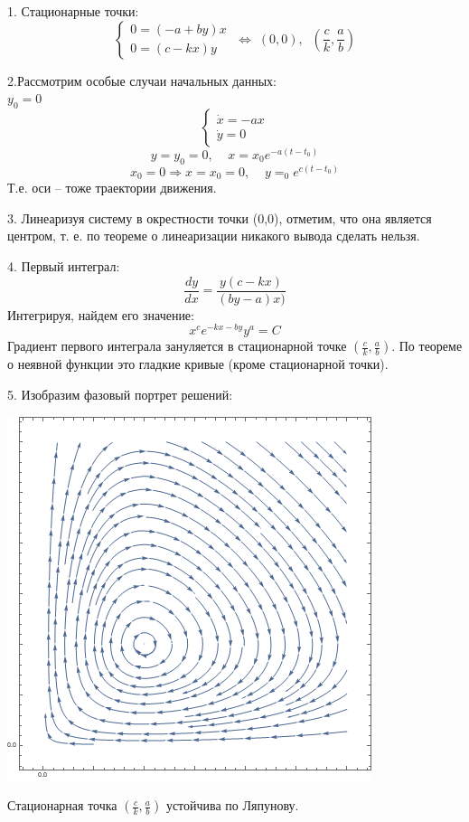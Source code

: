 \documentclass[10pt]{report}
\begin{document}
1. Стационарные точки:\\
\[\left\{
\begin{array}{lr}
0=(-a+by)x\\
0=(c-kx)y
\end{array}
\right.\; \Leftrightarrow \; (0, 0), \;\; \left(\frac c k, \frac a b\right)\]

2.Рассмотрим особые случаи начальных данных:\\
 $y_0=0$
\[\left\{
\begin{array}{lr}
\dot{x}=-ax\\
\dot{y}=0
\end{array}
\right.\]
\[y=y_0=0, \;\;\;\; x=x_0e^{-a(t-t_0)}\]
\[x_0=0 \Rightarrow x=x_0=0,\;\;\;\; y=_0e^{c(t-t_0)}\]
Т.е. оси -- тоже траектории движения.

3. Линеаризуя систему в окрестности точки (0,0), отметим, что она является центром, т. е. по теореме о линеаризации никакого вывода сделать нельзя.
 
4. Первый интеграл:
\[ \frac {dy} {dx} = \frac {y(c-kx)} {(by-a)x)}\]
Интегрируя, найдем его значение:
\[x^ce^{-kx-by}y^a=C\]
Градиент первого интеграла зануляется в стационарной точке $\left(\frac c k, \frac a b\right)$. По теореме о неявной функции это гладкие кривые (кроме стационарной точки). 

5. Изобразим фазовый портрет решений:
\begin{center}
{\includegraphics[scale=0.8]{graph12.2.png}} 
\end{center}
Стационарная точка $\left(\frac c k, \frac a b\right)$ устойчива по Ляпунову.
\end{document}
